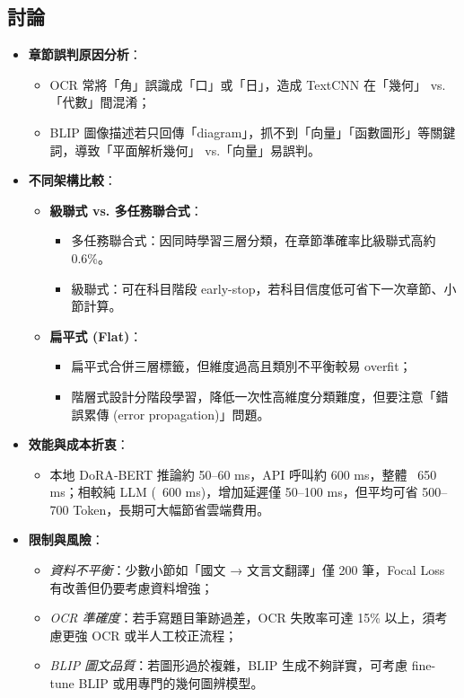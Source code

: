 \documentclass[10pt,conference]{IEEEtran}
\begin{document}
\begin{CJK}{UTF8}{bsmi}
\section{討論}
\begin{itemize}
  \item \textbf{章節誤判原因分析}：  
    \begin{itemize}
      \item OCR 常將「角」誤識成「口」或「日」，造成 TextCNN 在「幾何」 vs.「代數」間混淆；  
      \item BLIP 圖像描述若只回傳「diagram」，抓不到「向量」「函數圖形」等關鍵詞，導致「平面解析幾何」 vs.「向量」易誤判。  
    \end{itemize}
  \item \textbf{不同架構比較}：  
    \begin{itemize}
      \item \textbf{級聯式 vs. 多任務聯合式}：  
        \begin{itemize}
          \item 多任務聯合式：因同時學習三層分類，在章節準確率比級聯式高約 0.6\%。  
          \item 級聯式：可在科目階段 early-stop，若科目信度低可省下一次章節、小節計算。  
        \end{itemize}
      \item \textbf{扁平式 (Flat)}：  
        \begin{itemize}
          \item 扁平式合併三層標籤，但維度過高且類別不平衡較易 overfit；  
          \item 階層式設計分階段學習，降低一次性高維度分類難度，但要注意「錯誤累傳 (error propagation)」問題。
        \end{itemize}
    \end{itemize}
  \item \textbf{效能與成本折衷}：  
    \begin{itemize}
      \item 本地 DoRA‐BERT 推論約 50–60 ms，API 呼叫約 600 ms，整體 ~650 ms；相較純 LLM (~600 ms)，增加延遲僅 50–100 ms，但平均可省 500–700 Token，長期可大幅節省雲端費用。  
    \end{itemize}
  \item \textbf{限制與風險}：  
    \begin{itemize}
      \item \emph{資料不平衡}：少數小節如「國文 → 文言文翻譯」僅 200 筆，Focal Loss 有改善但仍要考慮資料增強；  
      \item \emph{OCR 準確度}：若手寫題目筆跡過差，OCR 失敗率可達 15\% 以上，須考慮更強 OCR 或半人工校正流程；  
      \item \emph{BLIP 圖文品質}：若圖形過於複雜，BLIP 生成不夠詳實，可考慮 fine-tune BLIP 或用專門的幾何圖辨模型。
    \end{itemize}
\end{itemize}


\end{CJK}
\end{document}
